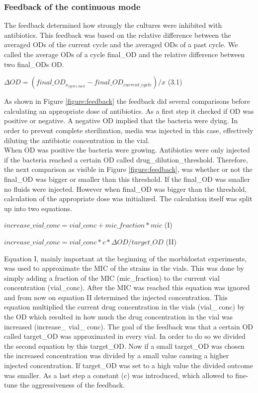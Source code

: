 \subsubsection{Feedback of the continuous mode} 
The feedback determined how strongly the cultures were inhibited with antibiotics. This feedback was based on the relative difference between the averaged ODs of the current cycle and the averaged ODs of a past cycle. We called the average ODs of a cycle final\_OD and the relative difference between two final\_ODs \textDelta OD. 
\begin{center}
	$\Delta OD = (final\_OD_{x_{cycles\_back}} - final\_OD_{current\_cycle})/x$ \quad (3.1) 
\end{center}
As shown in Figure \ref{figure:feedback} the feedback did several comparisons before calculating an appropriate dose of antibiotics. As a first step it checked if \textDelta OD was positive or negative. A negative \textDelta OD implied that the bacteria were dying. In order to prevent complete sterilization, media was injected in this case, effectively diluting the antibiotic concentration in the vial. \\
When \textDelta OD was positive the bacteria were growing. Antibiotics were only injected if the bacteria reached a certain OD called drug\_dilution\_threshold. Therefore, the next comparison as visible in Figure \ref{figure:feedback}, was whether or not the final\_OD was bigger or smaller than this threshold. If the final\_OD was smaller no fluids were injected.
However when final\_OD was bigger than the threshold, calculation of the appropriate dose was initialized.
The calculation itself was split up into two equations.
\begin{center}
	$increase\_vial\_conc = vial\_conc + mic\_fraction*mic$ \quad (I) \label{eq:plus}
\end{center}
\begin{center}	
	$increase\_vial\_conc = vial\_conc * c * \Delta OD/target\_OD$ \quad (II) \label{eq:mult}
\end{center}
Equation I, mainly important at the beginning of the morbidostat experiments, was used to approximate the MIC of the strains in the vials. This was done by simply adding a fraction of the MIC (mic\_fraction) to the current vial concentration (vial\_conc). After the MIC was reached this equation was ignored and from now on equation II determined the injected concentration. This equation multiplied the current drug concentration in the vials (vial\_ conc) by the \textDelta OD which resulted in how much the drug concentration in the vial was increased (increase\_ vial\_ conc).
The goal of the feedback was that a certain OD called target\_OD was approximated in every vial. In order to do so we divided the second equation by this target\_OD. Now if a small target\_OD was chosen the increased concentration was divided by a small value causing a higher injected concentration. If target\_OD was set to a high value the divided outcome was smaller. As a last step a constant (c) was introduced, which allowed to fine-tune the aggressiveness of the feedback.   

